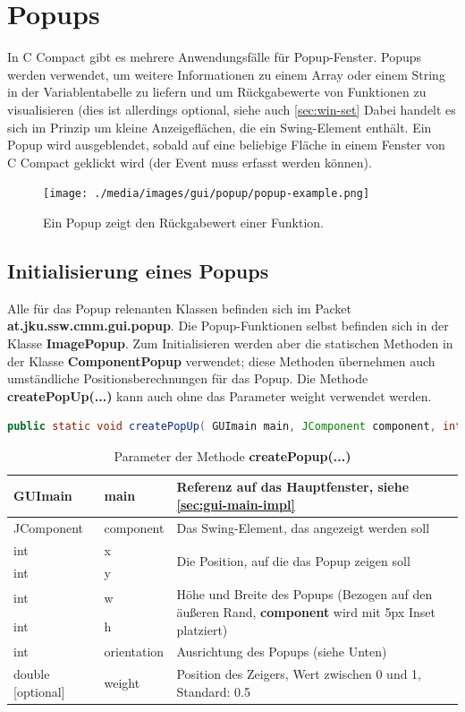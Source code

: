 
\section{Popups}
In C Compact gibt es mehrere Anwendungsfälle für Popup-Fenster. Popups werden verwendet, um weitere Informationen zu einem Array oder einem String in der Variablentabelle zu liefern und um Rückgabewerte von Funktionen zu visualisieren (dies ist allerdings optional, siehe auch \ref{sec:win-set} Dabei handelt es sich im Prinzip um kleine Anzeigeflächen, die ein Swing-Element enthält. Ein Popup wird ausgeblendet, sobald auf eine beliebige Fläche in einem Fenster von C Compact geklickt wird (der Event muss erfasst werden können).

\begin{figure}[htp]
\centering
\texttt{[image: ./media/images/gui/popup/popup-example.png]}
\caption{Ein Popup zeigt den Rückgabewert einer Funktion.}
\label{fig:popup-example}
\end{figure}

\subsection{Initialisierung eines Popups}
Alle für das Popup relenanten Klassen befinden sich im Packet \textbf{at.jku.ssw.cmm.gui.popup}. Die Popup-Funktionen selbst befinden sich in der Klasse \textbf{ImagePopup}. Zum Initialisieren werden aber die statischen Methoden in der Klasse \textbf{ComponentPopup} verwendet; diese Methoden übernehmen auch umständliche Positionsberechnungen für das Popup. Die Methode \textbf{createPopUp(...)} kann auch ohne das Parameter \glqq{}weight\grqq{} verwendet werden.
\begin{lstlisting}[language=JAVA]
public static void createPopUp( GUImain main, JComponent component, int x, int y, int w, int h, int orientation, double weight );
\end{lstlisting}

\begin{table}[h!]
\begin{tabular}{|ll|l|}
\hline 
GUImain & main  & Referenz auf das Hauptfenster, siehe \ref{sec:gui-main-impl} \\
\hline
JComponent & component & Das Swing-Element, das angezeigt werden soll \\
\hline
int & x & \multirow{2}{8cm}{Die Position, auf die das Popup zeigen soll} \\
int & y & \\
\hline 
int & w & \multirow{2}{8cm}{Höhe und Breite des Popups (Bezogen auf den äußeren Rand, \textbf{component} wird mit 5px Inset platziert)} \\
int & h & \\
\hline
int & orientation & Ausrichtung des Popups (siehe Unten) \\
\hline
double [optional] & weight & Position des Zeigers, Wert zwischen 0 und 1, Standard: 0.5\\
\hline
\end{tabular}
\caption{Parameter der Methode \textbf{createPopup(...)}}
\end{table}


